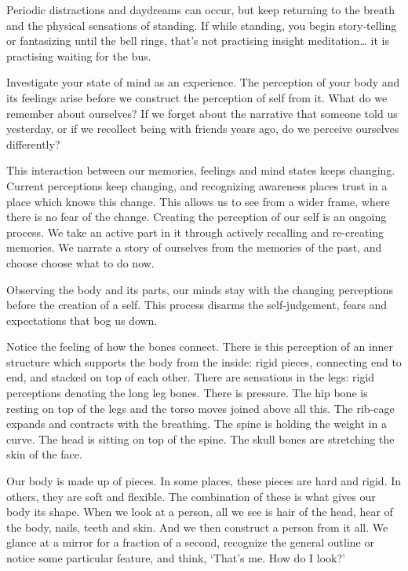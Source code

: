 Periodic distractions and daydreams can occur, but keep returning to the
breath and the physical sensations of standing. If while standing, you
begin story-telling or fantasizing until the bell rings, that's not
practising insight meditation\ldots{} it is practising waiting for the
bus.


\enlargethispage{\baselineskip}

Investigate your state of mind as an experience. The perception of your
body and its feelings arise before we construct the perception of self
from it. What do we remember about ourselves? If we forget about the
narrative that someone told us yesterday, or if we recollect being with
friends years ago, do we perceive ourselves differently?

This interaction between our memories, feelings and mind states keeps
changing. Current perceptions keep changing, and recognizing awareness
places trust in a place which knows this change. This allows us to see
from a wider frame, where there is no fear of the change. Creating the
perception of our self is an ongoing process. We take an active part in
it through actively recalling and re-creating memories. We narrate a
story of ourselves from the memories of the past, and choose choose what
to do now.


Observing the body and its parts, our minds stay with the changing
perceptions before the creation of a self. This process disarms the
self-judgement, fears and expectations that bog us down.

Notice the feeling of how the bones connect. There is this perception of
an inner structure which supports the body from the inside: rigid
pieces, connecting end to end, and stacked on top of each other. There
are sensations in the legs: rigid perceptions denoting the long leg
bones. There is pressure. The hip bone is resting on top of the legs and
the torso moves joined above all this. The rib-cage expands and
contracts with the breathing. The spine is holding the weight in a
curve. The head is sitting on top of the spine. The skull bones are
stretching the skin of the face.

\enlargethispage*{\baselineskip}

Our body is made up of pieces. In some places, these pieces are hard and
rigid. In others, they are soft and flexible. The combination of these
is what gives our body its shape. When we look at a person, all we see
is hair of the head, hear of the body, nails, teeth and skin. And we
then construct a person from it all. We glance at a mirror for a
fraction of a second, recognize the general outline or notice some
particular feature, and think, `That's me. How do I look?'


